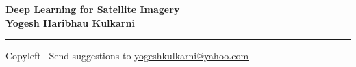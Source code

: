 
\graphicspath{{images/}}

\footnotesize


\begin{center}
\Large{\textbf{Deep Learning for Satellite Imagery\\ Yogesh Haribhau Kulkarni}}  
\end{center}

\begin{multicols}{2}

\end{multicols}

\rule{\linewidth}{0.25pt}
\scriptsize
Copyleft \textcopyleft\  Send suggestions to 
\href{http://www.yogeshkulkarni.com}{yogeshkulkarni@yahoo.com}


